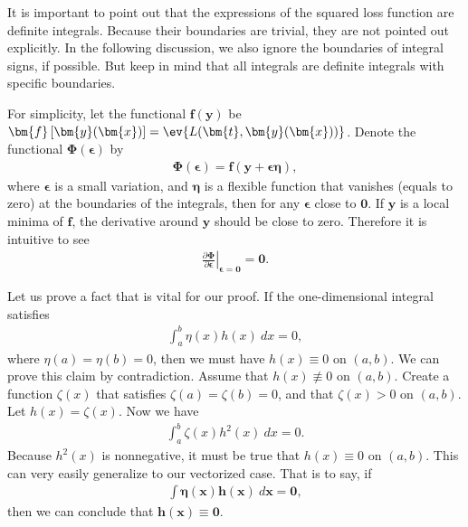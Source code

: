 \begin{answer}{}
	It is important to point out that the expressions of the squared loss function are definite integrals. Because their boundaries are trivial, they are not pointed out explicitly. In the following discussion, we also ignore the boundaries of integral signs, if possible. But keep in mind that all integrals are definite integrals with specific boundaries.
	
	For simplicity, let the functional $\bm{f}(\bm{y})$ be $\bm{f}\left[\bm{y}(\bm{x})\right] = \ev{L(\bm{t}, \bm{y}(\bm{x}))}$. Denote the functional $\bm{\Phi}(\bm{\epsilon})$ by
	\begin{align}
		\bm{\Phi}(\bm{\epsilon}) = \bm{f}(\bm{y} + \bm{\epsilon}\bm{\eta}),
	\end{align}
	where $\bm{\epsilon}$ is a small variation, and $\bm{\eta}$ is a flexible function that vanishes (equals to zero) at the boundaries of the integrals, then for any $\bm{\epsilon}$ close to $\bm{0}$. If $\bm{y}$ is a local minima of $\bm{f}$, the derivative around $\bm{y}$ should be close to zero. Therefore it is intuitive to see
	\begin{align}\label{1.25eqn1}
		\left.\frac{\partial \bm{\Phi}}{\partial \bm{\epsilon}}\right\lvert_{\bm{\epsilon} = \bm{0}} = \bm{0}.
	\end{align}
	
	Let us prove a fact that is vital for our proof. If the one-dimensional integral satisfies
	\begin{align}
		\int_{a}^{b} \eta(x)h(x)\ dx = 0,
	\end{align}
	where $\eta(a) = \eta(b) = 0$, then we must have $h(x) \equiv 0$ on $(a, b)$. We can prove this claim by contradiction. Assume that $h(x) \not\equiv 0$ on $(a, b)$. Create a function $\zeta(x)$ that satisfies $\zeta(a) = \zeta(b) = 0$, and that $\zeta(x) > 0$ on $(a, b)$. Let $h(x) = \zeta(x)$. Now we have
	\begin{align}
		\int_{a}^{b} \zeta(x)h^2(x)\ dx = 0.
	\end{align}
	Because $h^2(x)$ is nonnegative, it must be true that $h(x) \equiv 0$ on $(a, b)$. This can very easily generalize to our vectorized case. That is to say, if
	\begin{align}\label{1.25eqn2}
		\int \bm{\eta}(\bm{x}) \bm{h}(\bm{x})\ d\bm{x} = \bm{0},
	\end{align}
	then we can conclude that $ \bm{h}(\bm{x}) \equiv \bm{0}$.
	

\end{answer}
